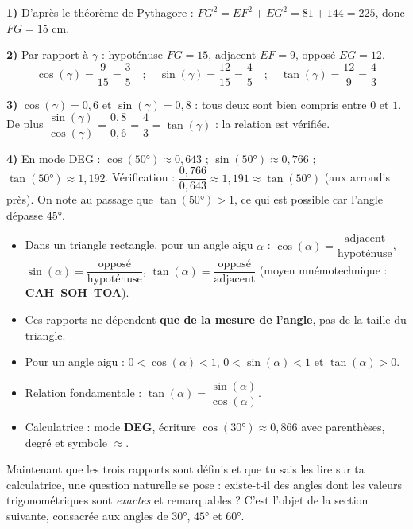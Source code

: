 \documentclass[11pt]{article}
\begin{document}
\begin{corrige}
\textbf{1)} D'après le théorème de Pythagore : $FG^2 = EF^2 + EG^2 = 81 + 144 = 225$, donc $FG = 15$ cm.

\textbf{2)} Par rapport à $\gamma$ : hypoténuse $FG = 15$, adjacent $EF = 9$, opposé $EG = 12$.
\[ \cos(\gamma) = \dfrac{9}{15} = \dfrac{3}{5} \quad ; \quad \sin(\gamma) = \dfrac{12}{15} = \dfrac{4}{5} \quad ; \quad \tan(\gamma) = \dfrac{12}{9} = \dfrac{4}{3} \]

\textbf{3)} $\cos(\gamma) = 0,6$ et $\sin(\gamma) = 0,8$ : tous deux sont bien compris entre $0$ et $1$. De plus $\dfrac{\sin(\gamma)}{\cos(\gamma)} = \dfrac{0,8}{0,6} = \dfrac{4}{3} = \tan(\gamma)$ : la relation est vérifiée.

\textbf{4)} En mode DEG : $\cos(50°) \approx 0,643$ ; $\sin(50°) \approx 0,766$ ; $\tan(50°) \approx 1,192$. Vérification : $\dfrac{0,766}{0,643} \approx 1,191 \approx \tan(50°)$ (aux arrondis près). On note au passage que $\tan(50°) > 1$, ce qui est possible car l'angle dépasse $45°$.
\end{corrige}

\begin{aretenir}
\begin{itemize}
\item Dans un triangle rectangle, pour un angle aigu $\alpha$ : $\cos(\alpha) = \dfrac{\text{adjacent}}{\text{hypoténuse}}$, $\sin(\alpha) = \dfrac{\text{opposé}}{\text{hypoténuse}}$, $\tan(\alpha) = \dfrac{\text{opposé}}{\text{adjacent}}$ (moyen mnémotechnique : \textbf{CAH--SOH--TOA}).
\item Ces rapports ne dépendent \textbf{que de la mesure de l'angle}, pas de la taille du triangle.
\item Pour un angle aigu : $0 < \cos(\alpha) < 1$, $0 < \sin(\alpha) < 1$ et $\tan(\alpha) > 0$.
\item Relation fondamentale : $\tan(\alpha) = \dfrac{\sin(\alpha)}{\cos(\alpha)}$.
\item Calculatrice : mode \textbf{DEG}, écriture $\cos(30°) \approx 0,866$ avec parenthèses, degré et symbole $\approx$.
\end{itemize}
\end{aretenir}

Maintenant que les trois rapports sont définis et que tu sais les lire sur ta calculatrice, une question naturelle se pose : existe-t-il des angles dont les valeurs trigonométriques sont \emph{exactes} et remarquables ? C'est l'objet de la section suivante, consacrée aux angles de $30°$, $45°$ et $60°$.
\end{document}
